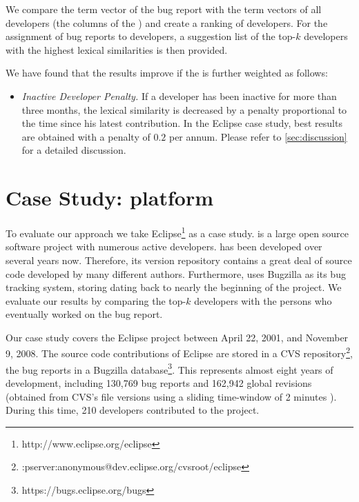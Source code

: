 \documentclass[10pt]{book}
\begin{document}
We compare the term vector of the bug report with the term vectors of all developers (\ie the columns of the \TAM) and create a ranking of developers. For the assignment of bug reports to developers, a suggestion list of the top-$k$ developers with the highest lexical similarities is then provided.

We have found that the results improve if the \TAM is further weighted as follows:
\begin{itemize}
\item \emph{Inactive Developer Penalty.} If a developer has been inactive for more than three months, the lexical similarity is decreased by a penalty proportional to the time since his latest contribution. In the Eclipse case study, best results are obtained with a penalty of $0.2$ per annum. Please refer to \autoref{sec:discussion} for a detailed discussion.
\end{itemize}

\section{Case Study: \EC platform}\label{sec:casestudy}

To evaluate our approach we take Eclipse\footnote{http://www.eclipse.org/eclipse} as a case study. \EC is a large open source software project with numerous active developers.
\EC has been developed over several years now. Therefore, its version repository contains a great deal of source code developed by many different authors.
Furthermore, \EC uses Bugzilla as its bug tracking system, storing \BRs dating back to nearly the beginning of the project.
We evaluate our results by comparing the top-$k$ developers with the persons who eventually worked on the bug report.

Our case study covers the Eclipse project between April 22, 2001, and November 9, 2008. The source code contributions of Eclipse are stored in a CVS repository\footnote{:pserver:anonymous@dev.eclipse.org/cvsroot/eclipse}, the bug reports in a Bugzilla database\footnote{https://bugs.eclipse.org/bugs}. This represents almost eight years of development, including 130,769 bug reports and 162,942 global revisions (obtained from CVS's file versions using a sliding time-window of 2 minutes \cite{Zimm04a}). During this time, 210 developers contributed to the project.
\end{document}
